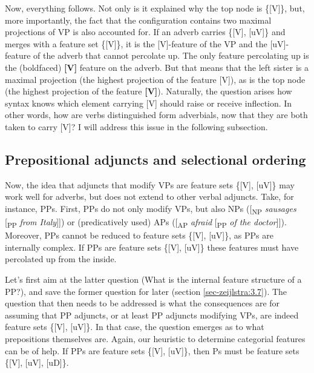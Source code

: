 \documentclass[output=paper
,modfonts
,nonflat]{langsci/langscibook}
\begin{document}
\begin{figure}[!h]
	\begin{exe}
		\exbox{
			\begin{forest}	
				[\{{[}{V}{]}\}
				[\{{[}V{]}\}]
				[\{{[}{V}{]}{,} {[}uV{]}\}] ]
		\end{forest}}
	\end{exe}
\end{figure} \vspace{-0.75cm}
\noindent Now, everything follows. Not only is it explained why the top node is \{[V]\}, but, more importantly, the fact that the configuration contains two maximal projections of VP is also accounted for. If an adverb carries \{[V], [uV]\} and merges with a feature set \{[V]\}, it is the [V]-feature of the VP and the [uV]-feature of the adverb that cannot percolate up. The only feature percolating up is the (boldfaced) \textbf{[V]} feature on the adverb. But that means that the left sister is a maximal projection (the highest projection of the feature [V]), as is the top node (the highest projection of the feature \textbf{[V]}). Naturally, the question arises how syntax knows which element carrying [V] should raise or receive inflection. In other words, how are verbs distinguished form adverbials, now that they are both taken to carry [V]? I will address this issue in the following subsection.

\subsection{Prepositional adjuncts and selectional ordering} \label{sec-zeijlstra:3.3}
Now, the idea that adjuncts that modify VPs are feature sets \{[V], [uV]\} may work well for adverbs, but does not extend to other verbal adjuncts. Take, for instance, PPs. First, PPs do not only modify VPs, but also NPs ([\textsubscript{NP} \textit{sausages} [\textsubscript{PP} \textit{from Italy}]]) or (predicatively used) APs ([\textsubscript{AP} \textit{afraid} [\textsubscript{PP} \textit{of the doctor}]]). Moreover, PPs cannot be reduced to feature sets \{[V], [uV]\}, as PPs are internally complex. If PPs are feature sets \{[V], [uV]\} these features must have percolated up from the inside.

Let’s first aim at the latter question (What is the internal feature structure of a PP?), and save the former question for later (section \ref{sec-zeijlstra:3.7}). The question that then needs to be addressed is what the consequences are for assuming that PP adjuncts, or at least PP adjuncts modifying VPs, are indeed feature sets \{[V], [uV]\}. In that case, the question emerges as to what prepositions themselves are. Again, our heuristic to determine categorial features can be of help. If PPs are feature sets \{[V], [uV]\}, then Ps must be feature sets \{[V], [uV], [uD]\}.
\end{document}
